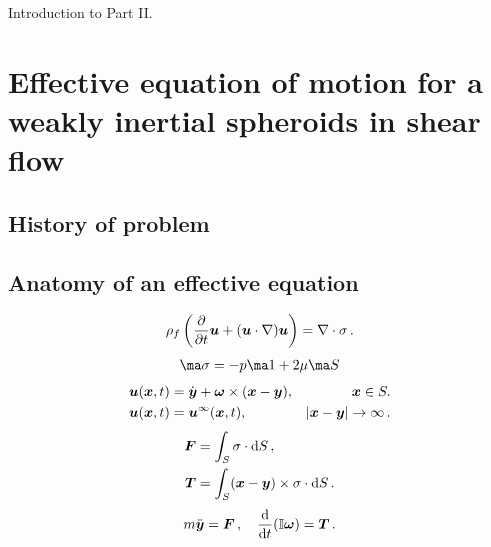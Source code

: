\documentclass[thesis.tex]{subfiles}
\begin{document}
Introduction to Part II.

\chapter{Effective equation of motion for a weakly inertial spheroids in shear flow}

\section{History of problem}

\section{Anatomy of an effective equation}

\begin{align}
    \rho_f \left(\frac{\partial }{\partial t}\mbox{\boldmath$u$} + (\mbox{\boldmath$u$} \cdot \nabla) \mbox{\boldmath$u$}\right)=\nabla \cdot \mathbb{\sigma}\,.
\end{align}
\begin{align}
    \ma \sigma = -p \ma 1 + 2\mu \ma S
\end{align}
\begin{align}
    \mbox{\boldmath$u$}(\mbox{\boldmath$x$}, t) &= \dot{\mbox{\boldmath$y$}} + \mbox{\boldmath$\omega$} \times (\mbox{\boldmath$x$} - \mbox{\boldmath$y$}), & \mbox{\boldmath$x$} \in S. \nonumber\\
    \mbox{\boldmath$u$}(\mbox{\boldmath$x$}, t) &= \mbox{\boldmath$u$}^\infty(\mbox{\boldmath$x$}, t), & |\mbox{\boldmath$x$}-\mbox{\boldmath$y$}|\to\infty\,.
\end{align}
\begin{align}
    \mbox{\boldmath$F$} &= \int_S \mathbb{\sigma} \cdot \mathrm{d} S\,, \\
    \mbox{\boldmath$T$} &= \int_S (\mbox{\boldmath$x$} - \mbox{\boldmath$y$}) \times \mathbb{\sigma} \cdot \mathrm{d} S\,.
\end{align}
\begin{align}
    m\ddot{\mbox{\boldmath$y$}} = \mbox{\boldmath$F$}\,, \quad \frac{\mathrm{d} }{\mathrm{d} t}(\mathbb{I} \mbox{\boldmath$\omega$}) = \mbox{\boldmath$T$}\,.
\end{align}
\end{document}
